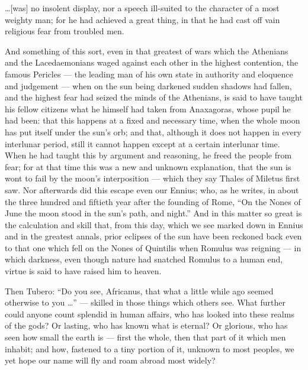  \ldots[was] no insolent display, nor a speech ill-suited to the character of a most weighty man; for he had achieved a great thing, in that he had cast off vain religious fear from troubled men.

 And something of this sort, even in that greatest of wars which the Athenians and the Lacedaemonians waged against each other in the highest contention, the famous Pericles --- the leading man of his own state in authority and eloquence and judgement --- when on the sun being darkened sudden shadows had fallen, and the highest fear had seized the minds of the Athenians, is said to have taught his fellow citizens what he himself had taken from Anaxagoras, whose pupil he had been: that this happens at a fixed and necessary time, when the whole moon has put itself under the sun's orb; and that, although it does not happen in every interlunar period, still it cannot happen except at a certain interlunar time. When he had taught this by argument and reasoning, he freed the people from fear; for at that time this was a new and unknown explanation, that the sun is wont to fail by the moon's interposition --- which they say Thales of Miletus first saw. Nor afterwards did this escape even our Ennius; who, as he writes, in about the three hundred and fiftieth year after the founding of Rome, ``On the Nones of June the moon stood in the sun's path, and night.'' And in this matter so great is the calculation and skill that, from this day, which we see marked down in Ennius and in the greatest annals, prior eclipses of the sun have been reckoned back even to that one which fell on the Nones of Quintilis when Romulus was reigning --- in which darkness, even though nature had snatched Romulus to a human end, virtue is said to have raised him to heaven.

 Then Tubero: ``Do you see, Africanus, that what a little while ago seemed otherwise to you \ldots'' --- skilled in those things which others see. What further could anyone count splendid in human affairs, who has looked into these realms of the gods? Or lasting, who has known what is eternal? Or glorious, who has seen how small the earth is --- first the whole, then that part of it which men inhabit; and how, fastened to a tiny portion of it, unknown to most peoples, we yet hope our name will fly and roam abroad most widely?

